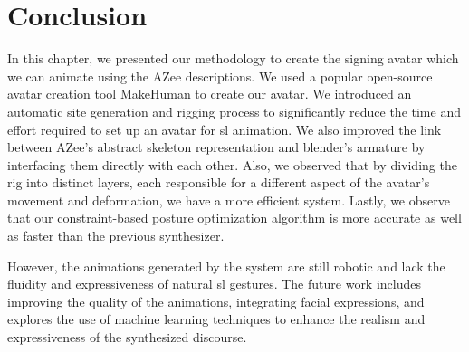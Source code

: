 \documentclass[../../main.tex]{subfiles}
\begin{document}


\section{Conclusion}
\label{ch:avatar_creation_pose_synthesis:conclusion}

In this chapter, we presented our methodology to create the signing avatar which we can animate using the AZee descriptions. We used a popular open-source avatar creation tool MakeHuman to create our avatar. We introduced an automatic site generation and rigging process to significantly reduce the time and effort required to set up an avatar for \gls{sl} animation. We also improved the link between AZee's abstract skeleton representation and blender's armature by interfacing them directly with each other. Also, we observed that by dividing the rig into distinct layers, each responsible for a different aspect of the avatar's movement and deformation, we have a more efficient system. Lastly, we observe that our constraint-based posture optimization algorithm is more accurate as well as faster than the previous synthesizer.

However, the animations generated by the system are still robotic and lack the fluidity and expressiveness of natural \gls{sl} gestures. The future work includes improving the quality of the animations, integrating facial expressions, and explores the use of machine learning techniques to enhance the realism and expressiveness of the synthesized discourse.
\end{document}
